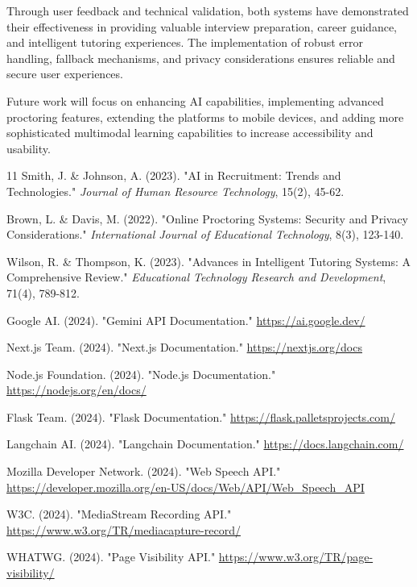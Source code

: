 \documentclass[12pt, conference]{IEEEtran}
\begin{document}
Through user feedback and technical validation, both systems have demonstrated their effectiveness in providing valuable interview preparation, career guidance, and intelligent tutoring experiences. The implementation of robust error handling, fallback mechanisms, and privacy considerations ensures reliable and secure user experiences.

Future work will focus on enhancing AI capabilities, implementing advanced proctoring features, extending the platforms to mobile devices, and adding more sophisticated multimodal learning capabilities to increase accessibility and usability.


\begin{thebibliography}{11}
 Smith, J. \& Johnson, A. (2023). "AI in Recruitment: Trends and Technologies." \emph{Journal of Human Resource Technology}, 15(2), 45-62.

 Brown, L. \& Davis, M. (2022). "Online Proctoring Systems: Security and Privacy Considerations." \emph{International Journal of Educational Technology}, 8(3), 123-140.

 Wilson, R. \& Thompson, K. (2023). "Advances in Intelligent Tutoring Systems: A Comprehensive Review." \emph{Educational Technology Research and Development}, 71(4), 789-812.

 Google AI. (2024). "Gemini API Documentation." \url{https://ai.google.dev/}

 Next.js Team. (2024). "Next.js Documentation." \url{https://nextjs.org/docs}

 Node.js Foundation. (2024). "Node.js Documentation." \url{https://nodejs.org/en/docs/}

 Flask Team. (2024). "Flask Documentation." \url{https://flask.palletsprojects.com/}

 Langchain AI. (2024). "Langchain Documentation." \url{https://docs.langchain.com/}

 Mozilla Developer Network. (2024). "Web Speech API." \url{https://developer.mozilla.org/en-US/docs/Web/API/Web_Speech_API}

 W3C. (2024). "MediaStream Recording API." \url{https://www.w3.org/TR/mediacapture-record/}

 WHATWG. (2024). "Page Visibility API." \url{https://www.w3.org/TR/page-visibility/}

\end{thebibliography}
\end{document}
